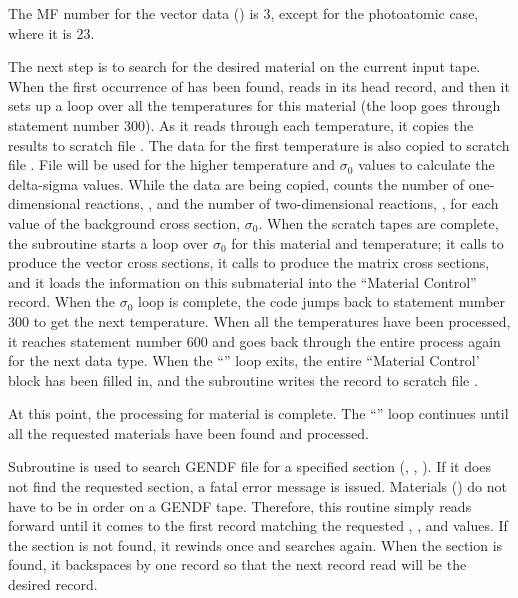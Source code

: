 \noindent
The MF number for the vector data () is 3, except for the
photoatomic case, where it is 23.

The next step is to search for the desired material  on
the current input tape.  When the first occurrence of  has
been found,  reads in its
head record, and then it sets up a loop over all the temperatures
for this material (the loop goes through statement number 300).  As
it reads through each temperature, it copies the results to scratch
file .  The data for the first temperature is also copied
to scratch file .  File  will be used for
the higher temperature and $\sigma_0$ values to calculate the
delta-sigma values.  While the data are being copied, 
counts the number of one-dimensional reactions, , and
the number of two-dimensional reactions, ,
for each value of the background cross section, $\sigma_0$.  When the
scratch tapes are complete, the subroutine starts a loop over $\sigma_0$
for this material and temperature; it calls
 to produce the vector
cross sections, it calls  to
produce the matrix cross sections, and it loads the information on
this submaterial into the ``Material Control'' record.  When the
$\sigma_0$ loop is complete, the code jumps back to statement
number 300 to get the next temperature.  When all the temperatures
have been processed, it reaches statement number 600 and goes back
through the entire process again for the next data type.  When the
``'' loop exits, the entire ``Material Control' block
has been filled in, and the subroutine writes the record to scratch
file .

At this point, the processing for material  is complete.
The ``'' loop continues until all the requested materials
have been found and processed.

Subroutine  is used to search
GENDF file  for a specified section (,
, ).  If it does not find the requested section,
a fatal error message is issued.  Materials () do not have to be
in order on a GENDF tape.  Therefore, this routine simply reads forward
until it comes to the first record matching the requested ,
, and  values.  If the section is not found,
it rewinds once and searches again.  When the section is found, it
backspaces by one record so that the next record read will be
the desired record.

